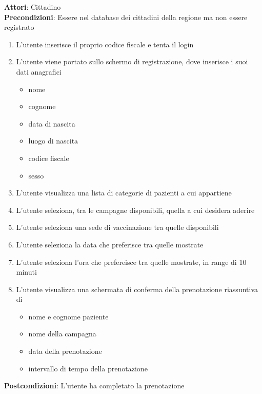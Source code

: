 \documentclass{article}
\begin{document}
\begin{framed}
    \noparskip{}
    \textbf{Attori}: Cittadino\\
    \textbf{Precondizioni}: Essere nel database dei cittadini della regione ma non essere registrato
    \begin{enumerate}
        \item L'utente inserisce il proprio codice fiscale e tenta il login
        \item L'utente viene portato sullo schermo di registrazione, dove inserisce i suoi dati anagrafici
            \begin{itemize}
                \item nome
                \item cognome
                \item data di nascita
                \item luogo di nascita
                \item codice fiscale
                \item sesso
            \end{itemize}
        \item L'utente visualizza una lista di categorie di pazienti a cui appartiene
        \item L'utente seleziona, tra le campagne disponibili, quella a cui desidera aderire
        \item L'utente seleziona una sede di vaccinazione tra quelle disponibili
        \item L'utente seleziona la data che preferisce tra quelle mostrate
        \item L'utente seleziona l'ora che prefereisce tra quelle mostrate, in range di 10 minuti
        \item L'utente visualizza una schermata di conferma della prenotazione riassuntiva di
            \begin{itemize}
                \item nome e cognome paziente
                \item nome della campagna
                \item data della prenotazione
                \item intervallo di tempo della prenotazione
            \end{itemize}
    \end{enumerate}
    \textbf{Postcondizioni}: L'utente ha completato la prenotazione
\end{framed}
\end{document}
